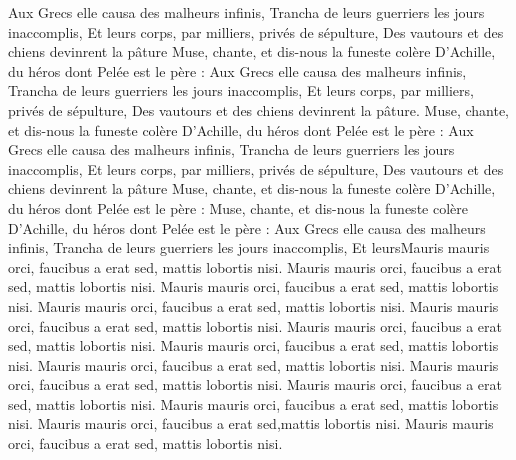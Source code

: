 \documentclass{memoir}
\begin{document}
{{Aux Grecs elle causa des malheurs infinis,
Trancha de leurs guerriers les jours inaccomplis,
Et leurs corps, par milliers, privés de sépulture,
Des vautours et des chiens devinrent la pâture
Muse, chante, et dis-nous la funeste colère
D'Achille, du héros dont Pelée est le père :
Aux Grecs elle causa des malheurs infinis,
Trancha de leurs guerriers les jours inaccomplis,
Et leurs corps, par milliers, privés de sépulture,
Des vautours et des chiens devinrent la pâture.
Muse, chante, et dis-nous la funeste colère
D'Achille, du héros dont Pelée est le père :
Aux Grecs elle causa des malheurs infinis,
Trancha de leurs guerriers les jours inaccomplis,
Et leurs corps, par milliers, privés de sépulture,
Des vautours et des chiens devinrent la pâture
Muse, chante, et dis-nous la funeste colère
D'Achille, du héros dont Pelée est le père :
Muse, chante, et dis-nous la funeste colère
D'Achille, du héros dont Pelée est le père :
Aux Grecs elle causa des malheurs infinis,
Trancha de leurs guerriers les jours inaccomplis,
Et leurs}}Mauris mauris orci, faucibus a erat sed, mattis lobortis nisi.  Mauris mauris orci, faucibus a erat sed, mattis lobortis nisi.  Mauris mauris orci, faucibus a erat sed, mattis lobortis nisi.  Mauris mauris orci, faucibus a erat sed, mattis lobortis nisi.  Mauris mauris orci, faucibus a erat sed, mattis lobortis nisi.  Mauris mauris orci, faucibus a erat sed, mattis lobortis nisi.  Mauris mauris orci, faucibus a erat sed, mattis lobortis nisi.  Mauris mauris orci, faucibus a erat sed, mattis lobortis nisi.  Mauris mauris orci, faucibus a erat sed, mattis lobortis nisi.  Mauris mauris orci, faucibus a erat sed, mattis lobortis nisi.  Mauris mauris orci, faucibus a erat sed, mattis lobortis nisi. Mauris mauris orci, faucibus a erat sed,mattis lobortis nisi. 
 Mauris mauris orci, faucibus a erat sed, mattis lobortis nisi.

\pend
\endnumbering
\end{document}
